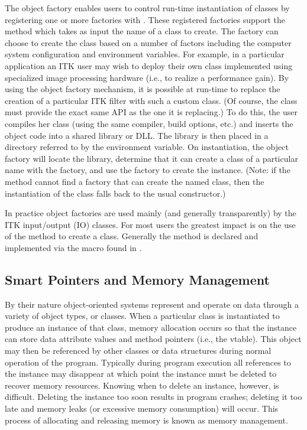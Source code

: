 The object factory enables users to control run-time instantiation of classes
by registering one or more factories with . These
registered factories support the method 
which takes as input the name of a class to create. The factory can choose to
create the class based on a number of factors including the computer system
configuration and environment variables. For example, in a particular
application an ITK user may wish to deploy their own class implemented using
specialized image processing hardware (i.e., to realize a performance
gain). By using the object factory mechanism, it is possible at run-time to
replace the creation of a particular ITK filter with such a custom class. (Of
course, the class must provide the exact same API as the one it is
replacing.) To do this, the user compiles her class (using the same compiler,
build options, etc.) and inserts the object code into a shared library or
DLL. The library is then placed in a directory referred to by the
 environment variable. On instantiation, the object
factory will locate the library, determine that it can create a class of a
particular name with the factory, and use the factory to create the
instance. (Note: if the  method cannot find a factory
that can create the named class, then the instantiation of the class falls
back to the usual constructor.)

In practice object factories are used mainly (and generally transparently) by
the ITK input/output (IO) classes. For most users the greatest impact is on
the use of the  method to create a class. Generally the
 method is declared and implemented via the macro
 found in .


\subsection{Smart Pointers and Memory Management}
\label{sec:SmartPointers}


By their nature object-oriented systems represent and operate on data through
a variety of object types, or classes. When a particular class is
instantiated to produce an instance of that class, memory allocation occurs
so that the instance can store data attribute values and method pointers
(i.e., the vtable). This object may then be referenced by other classes or
data structures during normal operation of the program. Typically during
program execution all references to the instance may disappear at which point
the instance must be deleted to recover memory resources. Knowing when to
delete an instance, however, is difficult. Deleting the instance too soon
results in program crashes; deleting it too late and memory leaks (or
excessive memory consumption) will occur. This process of allocating and
releasing memory is known as memory management.

